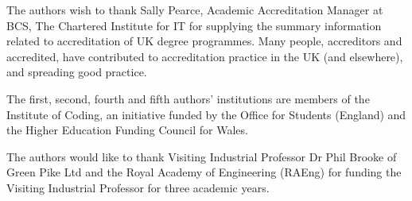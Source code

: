 \documentclass[conference]{IEEEtran}
\begin{document}
The authors wish to thank Sally Pearce, Academic Accreditation Manager at BCS, The Chartered Institute for IT for supplying the summary information related to accreditation of UK degree programmes. Many people, accreditors and accredited, have contributed to accreditation practice in the UK (and elsewhere), and spreading good practice.

The first, second, fourth and fifth authors' institutions are members of the Institute of Coding, an initiative funded by the Office for Students (England) and the Higher Education Funding Council for Wales.

The authors would like to thank Visiting Industrial Professor Dr Phil Brooke of Green Pike Ltd and the Royal Academy of Engineering (RAEng) for funding the Visiting Industrial Professor for three academic years.



%

\end{document}
